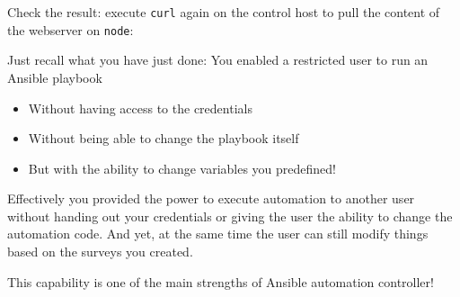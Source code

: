 Check the result: execute \texttt{curl} again on the control host to
pull the content of the webserver on \texttt{node}:

\begin{Shaded}
\begin{Highlighting}[]
\end{Highlighting}
\end{Shaded}

Just recall what you have just done: You enabled a restricted user to
run an Ansible playbook

\begin{itemize}
\item
  Without having access to the credentials
\item
  Without being able to change the playbook itself
\item
  But with the ability to change variables you predefined!
\end{itemize}

Effectively you provided the power to execute automation to another user
without handing out your credentials or giving the user the ability to
change the automation code. And yet, at the same time the user can still
modify things based on the surveys you created.

This capability is one of the main strengths of Ansible automation
controller!
